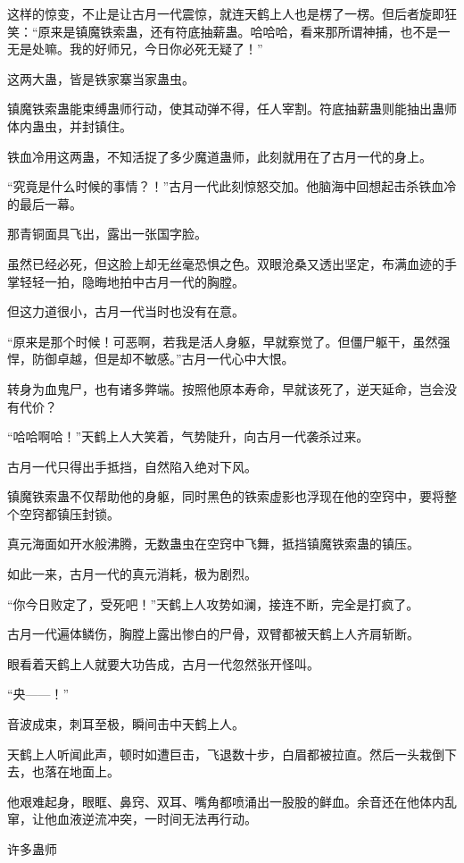\begin{this_body}
这样的惊变，不止是让古月一代震惊，就连天鹤上人也是楞了一楞。但后者旋即狂笑：“原来是镇魔铁索蛊，还有符底抽薪蛊。哈哈哈，看来那所谓神捕，也不是一无是处嘛。我的好师兄，今日你必死无疑了！”

这两大蛊，皆是铁家寨当家蛊虫。

镇魔铁索蛊能束缚蛊师行动，使其动弹不得，任人宰割。符底抽薪蛊则能抽出蛊师体内蛊虫，并封镇住。

铁血冷用这两蛊，不知活捉了多少魔道蛊师，此刻就用在了古月一代的身上。

“究竟是什么时候的事情？！”古月一代此刻惊怒交加。他脑海中回想起击杀铁血冷的最后一幕。

那青铜面具飞出，露出一张国字脸。

虽然已经必死，但这脸上却无丝毫恐惧之色。双眼沧桑又透出坚定，布满血迹的手掌轻轻一拍，隐晦地拍中古月一代的胸膛。

但这力道很小，古月一代当时也没有在意。

“原来是那个时候！可恶啊，若我是活人身躯，早就察觉了。但僵尸躯干，虽然强悍，防御卓越，但是却不敏感。”古月一代心中大恨。

转身为血鬼尸，也有诸多弊端。按照他原本寿命，早就该死了，逆天延命，岂会没有代价？

“哈哈啊哈！”天鹤上人大笑着，气势陡升，向古月一代袭杀过来。

古月一代只得出手抵挡，自然陷入绝对下风。

镇魔铁索蛊不仅帮助他的身躯，同时黑色的铁索虚影也浮现在他的空窍中，要将整个空窍都镇压封锁。

真元海面如开水般沸腾，无数蛊虫在空窍中飞舞，抵挡镇魔铁索蛊的镇压。

如此一来，古月一代的真元消耗，极为剧烈。

“你今日败定了，受死吧！”天鹤上人攻势如澜，接连不断，完全是打疯了。

古月一代遍体鳞伤，胸膛上露出惨白的尸骨，双臂都被天鹤上人齐肩斩断。

眼看着天鹤上人就要大功告成，古月一代忽然张开怪叫。

“央——！”

音波成束，刺耳至极，瞬间击中天鹤上人。

天鹤上人听闻此声，顿时如遭巨击，飞退数十步，白眉都被拉直。然后一头栽倒下去，也落在地面上。

他艰难起身，眼眶、鼻窍、双耳、嘴角都喷涌出一股股的鲜血。余音还在他体内乱窜，让他血液逆流冲突，一时间无法再行动。

许多蛊师


\end{this_body}
